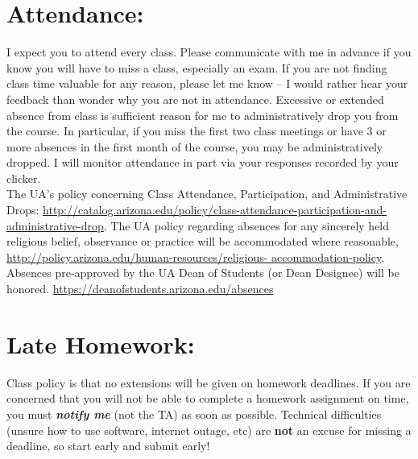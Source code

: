 \documentclass[11pt]{article}
\begin{document}
\vspace{0.5cm}


\section{\textbf{Attendance:}}
\vspace{-.65cm}
\hangindent=5cm 
I expect you to attend every class.
Please communicate with me in advance if you know you will have to miss a class, especially an exam.
If you are not finding class time valuable for any reason, please let me know -- I would rather hear your feedback than wonder why you are not in attendance.
Excessive or extended absence from class is sufficient reason for me to administratively drop you from the course.
In particular, if you miss the first two class meetings or have 3 or more absences in the first month of the course, you may be administratively dropped.
I will monitor attendance in part via your responses recorded by your clicker.\\

\hangindent=5cm 
The UA's policy concerning Class Attendance, Participation, and Administrative Drops: \href{http://catalog.arizona.edu/policy/class-attendance-participation-and-administrative-drop}{http://catalog.arizona.edu/policy/class-attendance-participation-and-administrative-drop}.
The UA policy regarding absences for any sincerely held religious belief, observance or practice will be accommodated where reasonable, \\\href{http://policy.arizona.edu/human-resources/religious-accommodation-policy}{http://policy.arizona.edu/human-resources/religious- accommodation-policy}.
Absences pre-approved by the UA Dean of Students (or Dean Designee) will be honored.  \href{https://deanofstudents.arizona.edu/absences}{https://deanofstudents.arizona.edu/absences}



\vspace{0.5cm}


\section{\textbf{Late Homework:}}
\vspace{-.65cm}
\hangindent=5cm 
Class policy is that no extensions will be given on homework deadlines.
If you are concerned that you will not be able to complete a homework assignment on time, you must \textbf{\textit{notify me}} (not the TA) as soon as possible.
Technical difficulties (unsure how to use software, internet outage, etc) are \textbf{not} an excuse for missing a deadline, so start early and submit early!
\end{document}
